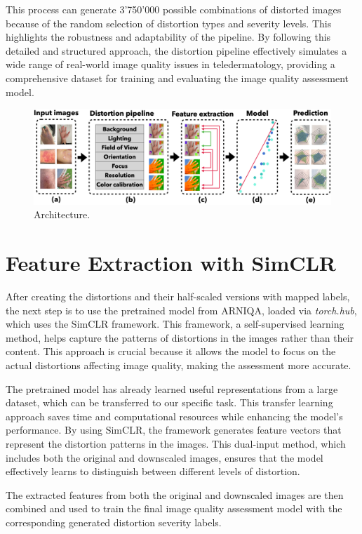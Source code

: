 \vspace{\baselineskip}
\noindent
This process can generate 3'750'000 possible combinations of distorted images because of the random selection of distortion types and severity levels. This highlights the robustness and adaptability of the pipeline. By following this detailed and structured approach, the distortion pipeline effectively simulates a wide range of real-world image quality issues in teledermatology, providing a comprehensive dataset for training and evaluating the image quality assessment model. \par

\begin{figure}[ht]
    \centering
    \includegraphics[keepaspectratio,width=15cm]{img/Architecture.png}
    \caption{Architecture.}
    \label{fig:Architecture}
\end{figure}

\section{Feature Extraction with SimCLR}
\label{sec:FeatureExtraction}
After creating the distortions and their half-scaled versions with mapped labels, the next step is to use the pretrained model from ARNIQA, loaded via \textit{torch.hub}, which uses the SimCLR framework. This framework, a self-supervised learning method, helps capture the patterns of distortions in the images rather than their content. This approach is crucial because it allows the model to focus on the actual distortions affecting image quality, making the assessment more accurate. \par
\vspace{\baselineskip}
\noindent
The pretrained model has already learned useful representations from a large dataset, which can be transferred to our specific task. This transfer learning approach saves time and computational resources while enhancing the model's performance. By using SimCLR, the framework generates feature vectors that represent the distortion patterns in the images. This dual-input method, which includes both the original and downscaled images, ensures that the model effectively learns to distinguish between different levels of distortion.\par
\vspace{\baselineskip}
\noindent
The extracted features from both the original and downscaled images are then combined and used to train the final image quality assessment model with the corresponding generated distortion severity labels. \par


